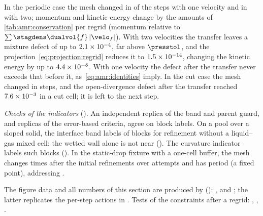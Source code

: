 In the periodic case the mesh changed in \chkAmrFlowOneRegrids{} of the
\chkAmrFlowSteps{} steps with one velocity and in \chkAmrFlowTwoRegrids{} with
two; momentum and kinetic energy change by the amounts of
\cref{tab:amr:conservation} per regrid (momentum relative to
$\sum\stagdens\dualvol{f}\abs{\velo_f}$). With two velocities the transfer
leaves a mixture defect of up to $2.1\times10^{-4}$, far above
$\presstol$, and the projection~\cref{eq:projection:regrid} reduces it to
$1.5\times10^{-14}$, changing the kinetic energy by up to
$4.4\times10^{-8}$. With one velocity the defect after the
transfer never exceeds that before it, as~\cref{eq:amr:identities} imply. In the cut case the mesh changed in
\chkAmrFlowCutRegrids{} steps, and the open-divergence defect after the
transfer reached $7.6\times10^{-3}$ in a cut cell; it is left to the
next step.

\emph{Checks of the indicators} (). An independent
replica of the band and parent guard, and replicas of the error-based criteria,
agree on \chkAmrLabelsCompared{} block labels. On a pool over a sloped solid,
the interface band labels \chkAmrWettedBlocks{} of \chkAmrArtifactBlocks{}
blocks for refinement without a liquid--gas mixed cell: the wetted wall alone
is not near (). The curvature indicator labels
\chkAmrCurvatureBlocks{} such blocks (). In the static-drop fixture
with a one-cell buffer, the mesh
changes \chkAmrCycleChanges{} times after the initial refinements over
\chkAmrCycleSteps{} attempts and has period \chkAmrCyclePeriod{} (a fixed
point), addressing .

\begin{implnote}
The figure data and all numbers of this section are produced by
 (): ,
 and ; the latter replicates the
per-step actions in .
Tests of the constraints
after a regrid:
,
,
.
\end{implnote}
